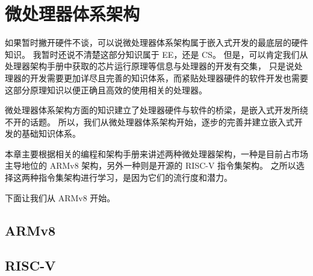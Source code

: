 \chapter{微处理器体系架构}

如果暂时撇开硬件不谈，可以说微处理器体系架构属于嵌入式开发的最底层的硬件知识。
我暂时还说不清楚这部分知识属于 EE，还是 CS。
但是，可以肯定我们从处理器架构手册中获取的芯片运行原理等信息与处理器的开发有交集，
只是说处理器的开发需要更加详尽且完善的知识体系，而紧贴处理器硬件的软件开发也需要这部分原理知识以便正确且高效的使用相关的处理器。

微处理器体系架构方面的知识建立了处理器硬件与软件的桥梁，是嵌入式开发所绕不开的话题。
所以，我们从微处理器体系架构开始，逐步的完善并建立嵌入式开发的基础知识体系。

本章主要根据相关的编程和架构手册来讲述两种微处理器架构，一种是目前占市场主导地位的 ARMv8 架构，另外一种则是开源的 RISC-V 指令集架构。
之所以选择这两种指令集架构进行学习，是因为它们的流行度和潜力。

下面让我们从 ARMv8 开始。

\section{ARMv8}


\section{RISC-V}


